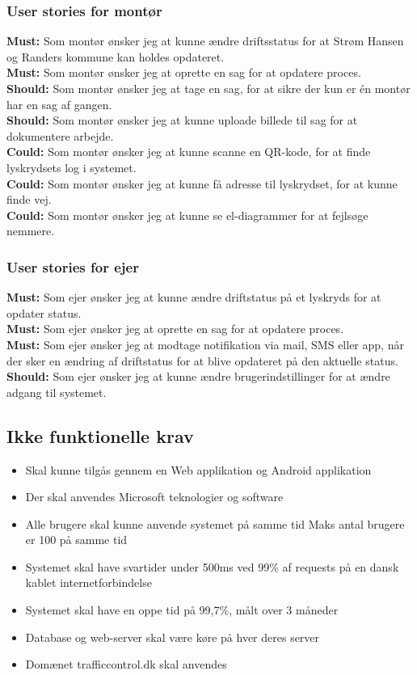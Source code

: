 \subsubsection{User stories for montør}
\textbf{Must:} Som montør ønsker jeg at kunne ændre driftsstatus for at Strøm Hansen og Randers kommune kan holdes opdateret.\\
\textbf{Must:} Som montør ønsker jeg at oprette en sag for at opdatere proces.\\	
\textbf{Should:} Som montør ønsker jeg at tage en sag, for at sikre der kun er én montør har en sag af gangen.\\
\textbf{Should:} Som montør ønsker jeg at kunne uploade billede til sag for at dokumentere arbejde.\\
\textbf{Could:} Som montør ønsker jeg at kunne scanne en QR-kode, for at finde lyskrydsets log i systemet.\\
\textbf{Could:} Som montør ønsker jeg at kunne få adresse til lyskrydset, for at kunne finde vej.\\
\textbf{Could:} Som montør ønsker jeg at kunne se el-diagrammer for at fejlsøge nemmere.

\subsubsection{User stories for ejer}
\textbf{Must:} Som ejer ønsker jeg at kunne ændre driftstatus på et lyskryds for at opdater status.\\
\textbf{Must:} Som ejer ønsker jeg at oprette en sag for at opdatere proces.\\
\textbf{Must:} Som ejer ønsker jeg at modtage notifikation via mail, SMS eller app, når der sker en ændring af driftstatus for at blive opdateret på den aktuelle status.\\
\textbf{Should:} Som ejer ønsker jeg at kunne ændre brugerindstillinger for at ændre adgang til systemet.

\hspace{1em}
\subsection{Ikke funktionelle krav}
\begin{itemize}[-]
	\itemsep 0.3em 
	\item Skal kunne tilgås gennem en Web applikation og Android applikation
	\item Der skal anvendes Microsoft teknologier og software
	\item Alle brugere skal kunne anvende systemet på samme tid Maks antal brugere er 100 på samme tid
	\item Systemet skal have svartider under 500ms ved 99\% af requests på en dansk kablet internetforbindelse
	\item Systemet skal have en oppe tid på 99,7\%, målt over 3 måneder
	\item Database og web-server skal være køre på hver deres server
	\item Domænet trafficcontrol.dk skal anvendes 
\end{itemize}

\hspace{1em}

\newpage
